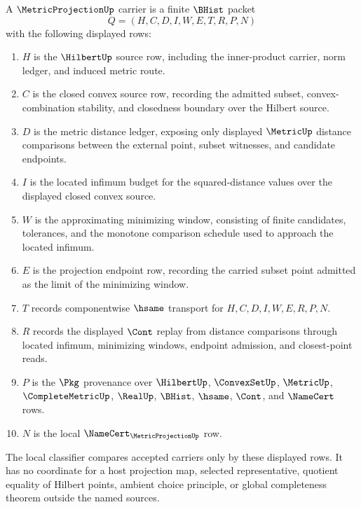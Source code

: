 \begin{definition}\label{def:metric-projection-carrier}
A $\MetricProjectionUp$ carrier is a finite $\BHist$ packet
$$
Q=(H,C,D,I,W,E,T,R,P,N)
$$
with the following displayed rows:
\begin{enumerate}
\item $H$ is the $\HilbertUp$ source row, including the inner-product carrier, norm ledger, and induced metric route.
\item $C$ is the closed convex source row, recording the admitted subset, convex-combination stability, and closedness boundary over the Hilbert source.
\item $D$ is the metric distance ledger, exposing only displayed $\MetricUp$ distance comparisons between the external point, subset witnesses, and candidate endpoints.
\item $I$ is the located infimum budget for the squared-distance values over the displayed closed convex source.
\item $W$ is the approximating minimizing window, consisting of finite candidates, tolerances, and the monotone comparison schedule used to approach the located infimum.
\item $E$ is the projection endpoint row, recording the carried subset point admitted as the limit of the minimizing window.
\item $T$ records componentwise $\hsame$ transport for $H,C,D,I,W,E,R,P,N$.
\item $R$ records the displayed $\Cont$ replay from distance comparisons through located infimum, minimizing windows, endpoint admission, and closest-point reads.
\item $P$ is the $\Pkg$ provenance over $\HilbertUp$, $\ConvexSetUp$, $\MetricUp$, $\CompleteMetricUp$, $\RealUp$, $\BHist$, $\hsame$, $\Cont$, and $\NameCert$ rows.
\item $N$ is the local $\NameCert_{\MetricProjectionUp}$ row.
\end{enumerate}
The local classifier compares accepted carriers only by these displayed rows. It has no coordinate for a host projection map, selected representative, quotient equality of Hilbert points, ambient choice principle, or global completeness theorem outside the named sources.
\end{definition}

